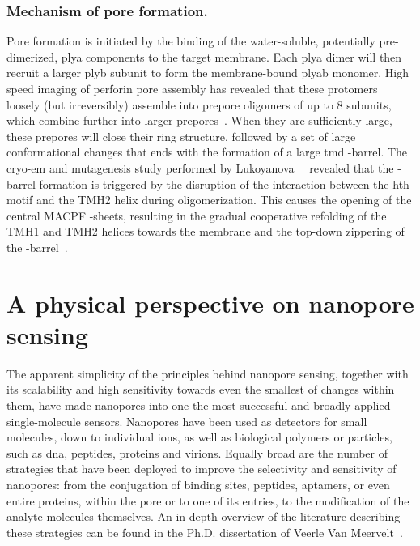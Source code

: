 \subsubsection{Mechanism of pore formation.}
%

Pore formation is initiated by the binding of the water-soluble, potentially pre-dimerized, \gls{plya}
components to the target membrane. Each \gls{plya} dimer will then recruit a larger \gls{plyb} subunit to form
the membrane-bound \gls{plyab} monomer. High speed imaging of perforin pore assembly has revealed that these
protomers loosely (but irreversibly) assemble into prepore oligomers of up to 8 subunits, which combine
further into larger prepores~\cite{Leung-2017}. When they are sufficiently large, these prepores will close
their ring structure, followed by a set of large conformational changes that ends with the formation of a
large \gls{tmd} \tb-barrel. The \gls{cryo-em} and mutagenesis study performed by
Lukoyanova~\etal{}~\cite{Lukoyanova-Kondos-2015} revealed that the \tb-barrel formation is triggered by the
disruption of the interaction between the \gls{hth}-motif and the {TMH2} helix during oligomerization. This
causes the opening of the central {MACPF} \tb-sheets, resulting in the gradual cooperative refolding of the
{TMH1} and {TMH2} helices towards the membrane and the top-down zippering of the
\tb-barrel~\cite{Reboul-2016}.


%
%

%
%
\section{A physical perspective on nanopore sensing}
%
\label{sec:np:physical_perspective}
%

The apparent simplicity of the principles behind nanopore sensing, together with its scalability and high
sensitivity towards even the smallest of changes within them, have made nanopores into one the most successful
and broadly applied single-molecule sensors. Nanopores have been used as detectors for small molecules, down
to individual ions, as well as biological polymers or particles, such as \gls{dna}, peptides, proteins and
virions. Equally broad are the number of strategies that have been deployed to improve the selectivity and
sensitivity of nanopores: from the conjugation of binding sites, peptides, aptamers, or even entire proteins,
within the pore or to one of its entries, to the modification of the analyte molecules themselves. An in-depth
overview of the literature describing these strategies can be found in the Ph.D. dissertation of Veerle Van
Meervelt~\cite{VanMeervelt-2017-PhD}.

